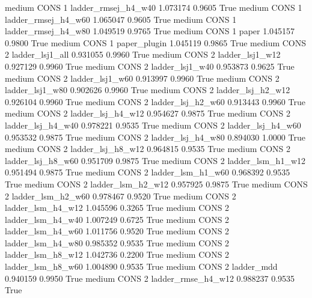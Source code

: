     medium     CONS                 1 ladder_rmsej_h4_w40   1.073174      0.9605    True
    medium     CONS                 1 ladder_rmsej_h4_w60   1.065047      0.9605    True
    medium     CONS                 1 ladder_rmsej_h4_w80   1.049519      0.9765    True
    medium     CONS                 1               paper   1.045157      0.9800    True
    medium     CONS                 1        paper_plugin   1.045119      0.9865    True
    medium     CONS                 2     ladder_lsj1_all   0.931055      0.9960    True
    medium     CONS                 2     ladder_lsj1_w12   0.927129      0.9960    True
    medium     CONS                 2     ladder_lsj1_w40   0.953873      0.9625    True
    medium     CONS                 2     ladder_lsj1_w60   0.913997      0.9960    True
    medium     CONS                 2     ladder_lsj1_w80   0.902626      0.9960    True
    medium     CONS                 2   ladder_lsj_h2_w12   0.926104      0.9960    True
    medium     CONS                 2   ladder_lsj_h2_w60   0.913443      0.9960    True
    medium     CONS                 2   ladder_lsj_h4_w12   0.954627      0.9875    True
    medium     CONS                 2   ladder_lsj_h4_w40   0.978221      0.9535    True
    medium     CONS                 2   ladder_lsj_h4_w60   0.953532      0.9875    True
    medium     CONS                 2   ladder_lsj_h4_w80   0.894030      1.0000    True
    medium     CONS                 2   ladder_lsj_h8_w12   0.964815      0.9535    True
    medium     CONS                 2   ladder_lsj_h8_w60   0.951709      0.9875    True
    medium     CONS                 2   ladder_lsm_h1_w12   0.951494      0.9875    True
    medium     CONS                 2   ladder_lsm_h1_w60   0.968392      0.9535    True
    medium     CONS                 2   ladder_lsm_h2_w12   0.957925      0.9875    True
    medium     CONS                 2   ladder_lsm_h2_w60   0.978467      0.9520    True
    medium     CONS                 2   ladder_lsm_h4_w12   1.045596      0.3265    True
    medium     CONS                 2   ladder_lsm_h4_w40   1.007249      0.6725    True
    medium     CONS                 2   ladder_lsm_h4_w60   1.011756      0.9520    True
    medium     CONS                 2   ladder_lsm_h4_w80   0.985352      0.9535    True
    medium     CONS                 2   ladder_lsm_h8_w12   1.042736      0.2200    True
    medium     CONS                 2   ladder_lsm_h8_w60   1.004890      0.9535    True
    medium     CONS                 2          ladder_mdd   0.940159      0.9950    True
    medium     CONS                 2  ladder_rmse_h4_w12   0.988237      0.9535    True
